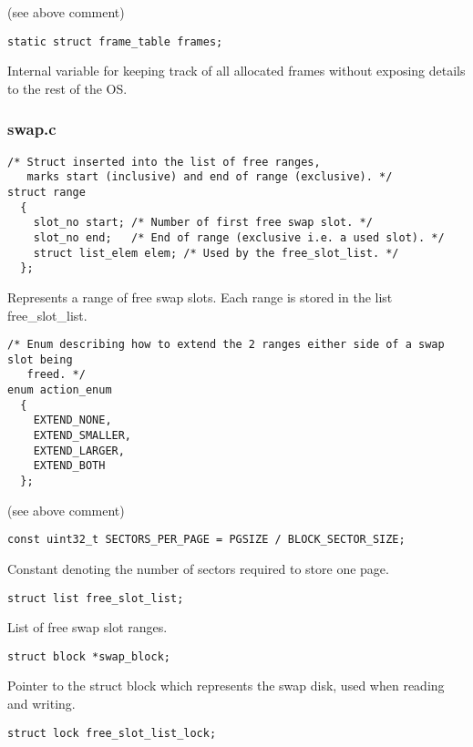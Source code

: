 (see above comment)

\begin{verbatim}
static struct frame_table frames;
\end{verbatim}

Internal variable for keeping track of all allocated frames without exposing details to the rest of the OS.

\subsubsection*{swap.c}

\begin{verbatim}
/* Struct inserted into the list of free ranges,
   marks start (inclusive) and end of range (exclusive). */
struct range
  {
    slot_no start; /* Number of first free swap slot. */
    slot_no end;   /* End of range (exclusive i.e. a used slot). */
    struct list_elem elem; /* Used by the free_slot_list. */
  };
\end{verbatim}

Represents a range of free swap slots. Each range is stored in the list free\_slot\_list.

\begin{verbatim}
/* Enum describing how to extend the 2 ranges either side of a swap slot being
   freed. */
enum action_enum
  {
    EXTEND_NONE,
    EXTEND_SMALLER,
    EXTEND_LARGER,
    EXTEND_BOTH
  };
\end{verbatim}

(see above comment)

\begin{verbatim}
const uint32_t SECTORS_PER_PAGE = PGSIZE / BLOCK_SECTOR_SIZE;
\end{verbatim}

Constant denoting the number of sectors required to store one page.

\begin{verbatim}
struct list free_slot_list;
\end{verbatim}

List of free swap slot ranges.

\begin{verbatim}
struct block *swap_block;
\end{verbatim}

Pointer to the struct block which represents the swap disk, used when reading and writing.

\begin{verbatim}
struct lock free_slot_list_lock;
\end{verbatim}


